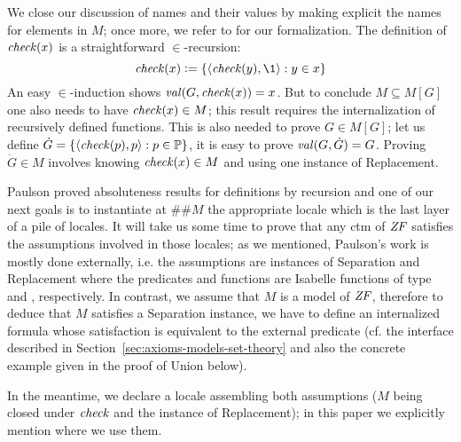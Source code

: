 We close our discussion of names and their values by making explicit
the names for elements in $M$; once more, we refer to
\cite{2018arXiv180705174G} for our formalization. The definition of
$\operatorname{\mathit{check}}(x)$ is a straightforward $\in$-recursion:
\begin{equation*}
  \label{eq:def-check}
  \chk(x)\defi\{\lb\chk(y),\1\rb : y\in x\}
\end{equation*}
An easy $\in$-induction shows $\operatorname{\mathit{val}}(G,\operatorname{\mathit{check}}(x))=x$.
But to conclude $M\subseteq M[G]$ one also needs to have
$\operatorname{\mathit{check}}(x) \in M$; this result requires the internalization of
recursively defined functions. This is also needed to prove
$G \in M[G]$; let us define
$\dot G= \{\langle \operatorname{\mathit{check}}(p),p\rangle : p \in \mathbb{P} \}$, it is easy to prove
$\operatorname{\mathit{val}}(G,\dot G) = G$. Proving $\dot G\in M$ involves knowing
$\operatorname{\mathit{check}}(x) \in M$ and using one instance of Replacement.

Paulson proved absoluteness results for definitions by recursion and
one of our next goals is to instantiate at $\#\#M$ the appropriate
locale 
 which is the last layer of a pile of
locales. It will take us some time to prove that any ctm of $\mathit{ZF}$ 
satisfies the
assumptions involved in those locales; as we mentioned, Paulson's work
is mostly done externally, i.e. the assumptions are instances
of Separation and Replacement where the predicates and functions are
Isabelle functions of type  and
, respectively. In contrast, we assume that
$M$ is a model of $\mathit{ZF}$, therefore to deduce that $M$ satisfies a
Separation instance, we have to define an internalized formula whose
satisfaction is equivalent to the external predicate (cf. the
interface described in Section~\ref{sec:axioms-models-set-theory} and
also the concrete example given in the proof of Union below).

In the meantime, we declare a locale
 assembling
both assumptions ($M$ being closed under $\operatorname{\mathit{check}}$ and the instance of
Replacement); in this paper we explicitly mention where we use them.

